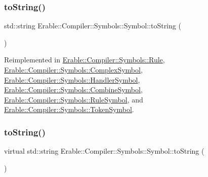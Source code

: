 \subsubsection{\texorpdfstring{toString()}{toString()}\hspace{0.1cm}{\footnotesize\ttfamily [1/2]}}
{\footnotesize\ttfamily std\+::string Erable\+::\+Compiler\+::\+Symbols\+::\+Symbol\+::to\+String (\begin{DoxyParamCaption}{ }\end{DoxyParamCaption})\hspace{0.3cm}{\ttfamily [virtual]}}



Reimplemented in \mbox{\hyperlink{class_erable_1_1_compiler_1_1_symbols_1_1_rule_a8bb5224d85a4867c71b6c1bc7ec901c0}{Erable\+::\+Compiler\+::\+Symbols\+::\+Rule}}, \mbox{\hyperlink{class_erable_1_1_compiler_1_1_symbols_1_1_complex_symbol_a90d749e601a727d6d42ddb195e65ea37}{Erable\+::\+Compiler\+::\+Symbols\+::\+Complex\+Symbol}}, \mbox{\hyperlink{class_erable_1_1_compiler_1_1_symbols_1_1_handler_symbol_ae0846995b3c622180725b160a1e17f8a}{Erable\+::\+Compiler\+::\+Symbols\+::\+Handler\+Symbol}}, \mbox{\hyperlink{struct_erable_1_1_compiler_1_1_symbols_1_1_combine_symbol_aedd44bc23607d42bdb45a35aba3dd184}{Erable\+::\+Compiler\+::\+Symbols\+::\+Combine\+Symbol}}, \mbox{\hyperlink{class_erable_1_1_compiler_1_1_symbols_1_1_rule_symbol_a068e32fb9ed0059c3da44fe47402a084}{Erable\+::\+Compiler\+::\+Symbols\+::\+Rule\+Symbol}}, and \mbox{\hyperlink{class_erable_1_1_compiler_1_1_symbols_1_1_token_symbol_a0f8499152ff070ae70295c9b25b25b93}{Erable\+::\+Compiler\+::\+Symbols\+::\+Token\+Symbol}}.

\mbox{\label{class_erable_1_1_compiler_1_1_symbols_1_1_symbol_aa9ae79d1be39c0e325e7edc75285c2a7}} 
\subsubsection{\texorpdfstring{toString()}{toString()}\hspace{0.1cm}{\footnotesize\ttfamily [2/2]}}
{\footnotesize\ttfamily virtual std\+::string Erable\+::\+Compiler\+::\+Symbols\+::\+Symbol\+::to\+String (\begin{DoxyParamCaption}{ }\end{DoxyParamCaption})\hspace{0.3cm}{\ttfamily [virtual]}}

